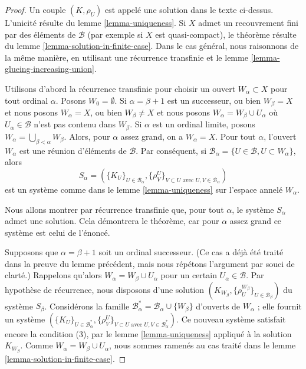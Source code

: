 \begin{proof}
Un couple $(K, \rho_U)$ est appelé une solution dans le texte ci-dessus. L'unicité résulte du lemme \ref{lemma-uniqueness}. Si $X$ admet un recouvrement fini par des éléments de $\mathcal{B}$ (par exemple si $X$ est quasi-compact), le théorème résulte du lemme \ref{lemma-solution-in-finite-case}. Dans le cas général, nous raisonnons de la même manière, en utilisant une récurrence transfinie et le lemme \ref{lemma-glueing-increasing-union}.

\medskip\noindent

Utilisons d'abord la récurrence transfinie pour choisir un ouvert $W_\alpha \subset X$
pour tout ordinal $\alpha$. Posons $W_0 = \emptyset$. Si $\alpha = \beta + 1$ est un successeur, ou bien $W_\beta = X$
et nous posons $W_\alpha = X$, ou bien $W_\beta \not = X$ et nous posons
$W_\alpha = W_\beta \cup U_\alpha$ où
$U_\alpha \in \mathcal{B}$ n'est pas contenu dans $W_\beta$. Si $\alpha$ est un ordinal limite, posons
$W_\alpha = \bigcup_{\beta < \alpha} W_\beta$. Alors, pour $\alpha$ assez grand, on a $W_\alpha = X$. Pour tout $\alpha$, l'ouvert $W_\alpha$ est une réunion d'éléments de $\mathcal{B}$. Par conséquent, si
$\mathcal{B}_\alpha = \{U \in \mathcal{B}, U \subset W_\alpha\}$, alors
$$
S_\alpha = (\{K_U\}_{U \in \mathcal{B}_\alpha},
\{\rho_V^U\}_{V \subset U\text{ avec }U, V \in \mathcal{B}_\alpha})
$$
est un système comme dans le lemme \ref{lemma-uniqueness} sur l'espace annelé $W_\alpha$.

\medskip\noindent
Nous allons montrer par récurrence transfinie que, pour tout $\alpha$, le système $S_\alpha$ admet une solution. Cela démontrera le théorème, car pour $\alpha$ assez grand ce système est celui de l'énoncé.

\medskip\noindent
Supposons que $\alpha = \beta + 1$ soit un ordinal successeur. (Ce cas a déjà été traité dans la preuve du lemme précédent, mais nous répétons l'argument par souci de clarté.) Rappelons qu'alors $W_\alpha = W_\beta \cup U_\alpha$ pour un certain $U_\alpha \in \mathcal{B}$. Par hypothèse de récurrence, nous disposons d'une solution $(K_{W_\beta}, \{\rho^{W_\beta}_U\}_{U \in \mathcal{B}_\beta})$ du système $S_\beta$. Considérons la famille $\mathcal{B}_\alpha^* = \mathcal{B}_\alpha \cup \{W_\beta\}$ d'ouverts de $W_\alpha$ ; elle fournit un système $(\{K_U\}_{U \in \mathcal{B}_\alpha^*},
\{\rho_V^U\}_{V \subset U\text{ avec }U, V \in \mathcal{B}_\alpha^*})$. Ce nouveau système satisfait encore la condition (3), par le lemme \ref{lemma-uniqueness} appliqué à la solution $K_{W_\beta}$. Comme $W_\alpha = W_\beta \cup U_\alpha$, nous sommes ramenés au cas traité dans le lemme \ref{lemma-solution-in-finite-case}.


\end{proof}
